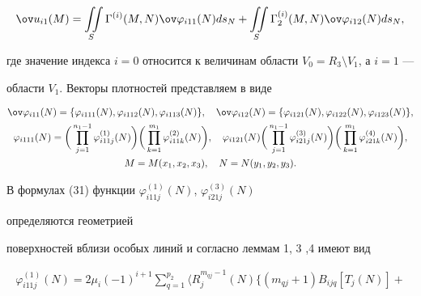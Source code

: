 \begin{pf}
\begin{equation} 


\ov u_{i1}(M)=\iint\limits_S \Gamma^{(i)}(M,N)\ov\varphi_{i11}(N)ds_N+ 


\iint\limits_S \Gamma^{(i)}_2(M,N)\ov\varphi_{i12}(N)ds_N, 


\end{equation} 


где значение индекса $i=0$ относится к величинам области $V_0=R_3\setminus 


V_1$, а $i=1$ --- 


области $V_1$. Векторы плотностей представляем в виде 


\begin{gather} 


\ov\varphi_{i11}(N)=\{\varphi_{i111}(N),\varphi_{i112}(N), 


\varphi_{i113}(N)\},\quad \ov\varphi_{i12}(N)=\{\varphi_{i121}(N), 


\varphi_{i122}(N),\varphi_{i123}(N)\},\\ 


% 


\varphi_{i111}(N)=\bigg(\prod^{n_1-1}_{j=1}\varphi^{(1)}_{i11j}(N)\bigg) 


\bigg(\prod^{m_1}_{k=1}\varphi^{(2)}_{i11k}(N)\bigg),\quad 


\varphi_{i121}(N)\bigg(\prod^{n_1-1}_{j=1} 


\varphi^{(3)}_{i21j}(N)\bigg)\bigg(\prod^{m_1}_{k=1} 


\varphi^{(4)}_{i21k}(N)\bigg),\notag \\ 


% 


M=M(x_1,x_2,x_3),\quad N=N(y_1,y_2,y_3).\notag 


\end{gather} 


 


В формулах (31) функции $\varphi^{(1)}_{i11j}(N)$, $\varphi^{(3)}_{i21j}(N)$ 


определяются геометрией  


поверхностей вблизи особых линий и согласно леммам 1, 3 ,4 имеют вид 


\begin{gather} 


\varphi^{(1)}_{i11j}(N)=2\mu_i(-1)^{i+1}\sum^{p_2}_{q=1}\Big\langle 


R^{m_{qj}-1}_j(N)\bigg\{(m_{qj}+1)B_{ijq}[T_j(N)]+ 



\end{gather}
\end{pf}
